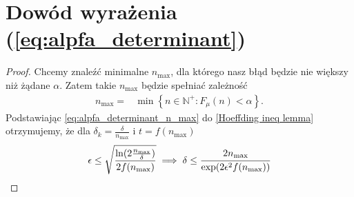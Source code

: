 \documentclass[inzynierska]{pwr_wmat_praca_dyplomowa}
\theoremstyle{plain}
\numberwithin{theorem}{chapter}
\theoremstyle{definition}
\numberwithin{theorem}{chapter}
\newcommand{\nmax}{n_{\text{max}}}
\begin{document}
\section{Dowód wyrażenia (\ref{eq:alpfa_determinant})}
\begin{proof}\label{proof:alpfa_determinant}
	Chcemy znaleźć minimalne $\nmax$, dla którego nasz błąd będzie nie większy niż żądane $\alpha$. Zatem takie $\nmax$ będzie spełniać zależność 
	\begin{align}
		\label{eq:alpfa_determinant_n_max}
		\nmax =& \min \left\{n\in \mathbb{N}^+: F_{\mu}(n) < \alpha \right\}.
	\end{align}
	Podstawiając \eqref{eq:alpfa_determinant_n_max} do \ref{Hoeffding ineq lemma} otrzymujemy, że dla $\delta_k = \frac{\delta}{\nmax}$ i $t = f(\nmax)$
	\begin{align*}
		\epsilon \le  \sqrt{\frac{\ln(2\frac{\nmax}{\delta})}{2f(\nmax)}} \implies \delta \le   \cfrac{2\nmax}{\exp(2\epsilon^2f(\nmax))}
	\end{align*}
\end{proof}




\end{document}
